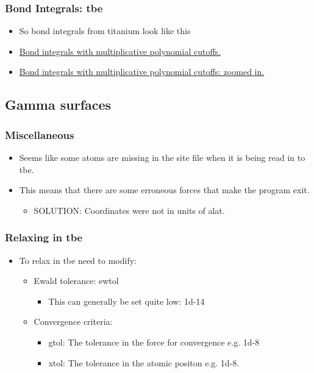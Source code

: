 \documentclass[11pt]{article}
\begin{document}
\subsubsection{Bond Integrals: tbe}
\label{sec-2-3-2}
\begin{itemize}
\item So bond integrals from titanium look like this
\item \href{file:///home/tigany/Documents/ti/complete_titanium/ti_01-11-18/plot_bond_integrals/tbe_bond_integrals_with_polynomial_cutoffs_multiplicative_alt.png}{Bond integrals with multiplicative polynomial cutoffs. }
\item \href{file:///home/tigany/Documents/ti/complete_titanium/ti_01-11-18/plot_bond_integrals/tbe_bond_integrals_with_polynomial_cutoffs_multiplicative_zoomed_in.png}{Bond integrals with multiplicative polynomial cutoffs: zoomed in.}
\end{itemize}

\subsection{Gamma surfaces}
\label{sec-2-4}
\subsubsection{Miscellaneous}
\label{sec-2-4-1}
\begin{itemize}
\item Seems like some atoms are missing in the site file when it is being read
in to tbe.
\item This means that there are some erroneous forces that make the program
exit.
\begin{itemize}
\item SOLUTION: Coordinates were not in units of alat.
\end{itemize}
\end{itemize}
\subsubsection{Relaxing in tbe}
\label{sec-2-4-2}
\begin{itemize}
\item To relax in tbe need to modify:
\begin{itemize}
\item Ewald tolerance: ewtol
\begin{itemize}
\item This can generally be set quite low: 1d-14
\end{itemize}
\item Convergence criteria:
\begin{itemize}
\item gtol: The tolerance in the force for convergence e.g. 1d-8
\item xtol: The tolerance in the atomic positon e.g. 1d-8.
\end{itemize}
\end{itemize}
\end{itemize}
\end{document}
